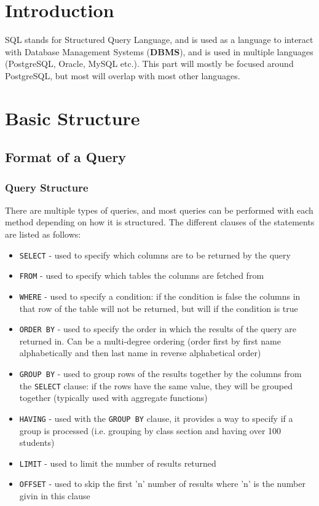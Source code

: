\documentclass[12pt, letterpaper]{report}
\begin{document}
\normalsize

\chapter{Introduction}

SQL stands for Structured Query Language, and is used as a language to interact with Database Management Systems (\textbf{DBMS}), and is used in multiple languages (PostgreSQL, Oracle, MySQL etc.). This part will mostly be focused around PostgreSQL, but most will overlap with most other languages. 

\chapter{Basic Structure}

\section{Format of a Query}

\subsection{Query Structure}

There are multiple types of queries, and most queries can be performed with each method depending on how it is structured. The different clauses of the statements are listed as follows:

\begin{itemize}
\small
	\item \verb|SELECT| - used to specify which columns are to be returned by the query
	\item \verb|FROM| - used to specify which tables the columns are fetched from
	\item \verb|WHERE| - used to specify a condition: if the condition is false the columns in that row of the table will not be returned, but will if the condition is true
	\item \verb|ORDER BY| - used to specify the order in which the results of the query are returned in. Can be a multi-degree ordering (order first by first name alphabetically and then last name in reverse alphabetical order)
	\item \verb|GROUP BY| - used to group rows of the results together by the columns from the \verb|SELECT| clause: if the rows have the same value, they will be grouped together (typically used with aggregate functions)
	\item \verb|HAVING| - used with the \verb|GROUP BY| clause, it provides a way to specify if a group is processed (i.e. grouping by class section and having over 100 students)
	\item \verb|LIMIT| - used to limit the number of results returned
	\item \verb|OFFSET| - used to skip the first 'n' number of results where 'n' is the number givin in this clause
\end{itemize}
\end{document}
